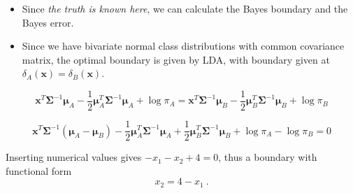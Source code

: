 \documentclass[10pt,ignorenonframetext,]{beamer}
\begin{document}
\begin{frame}

\begin{itemize}
\item
  Since \emph{the truth is known here}, we can calculate the Bayes
  boundary and the Bayes error.
\item
  Since we have bivariate normal class distributions with common
  covariance matrix, the optimal boundary is given by LDA, with boundary
  given at \(\delta_A({\boldsymbol x})=\delta_B({\boldsymbol x})\).
\end{itemize}

\[{\boldsymbol x}^T \boldsymbol{\Sigma}^{-1}\boldsymbol\mu_A - \frac{1}{2}\boldsymbol\mu_A^T \boldsymbol{\Sigma}^{-1}\boldsymbol\mu_A + \log \pi_A={\boldsymbol x}^T \boldsymbol{\Sigma}^{-1}\boldsymbol\mu_B - \frac{1}{2}\boldsymbol\mu_B^T \boldsymbol{\Sigma}^{-1}\boldsymbol\mu_B + \log \pi_B\]

\[{\boldsymbol x}^T\boldsymbol{\Sigma}^{-1}(\boldsymbol\mu_A -\boldsymbol\mu_B)-\frac{1}{2}\boldsymbol\mu_A^T \boldsymbol{\Sigma}^{-1}\boldsymbol\mu_A +\frac{1}{2}\boldsymbol\mu_B^T \boldsymbol{\Sigma}^{-1}\boldsymbol\mu_B +\log \pi_A-\log \pi_B=0\]

Inserting numerical values gives \(-x_1-x_2+4=0\), thus a boundary with
functional form \[x_2=4-x_1 \ .\]

\end{frame}
\end{document}
